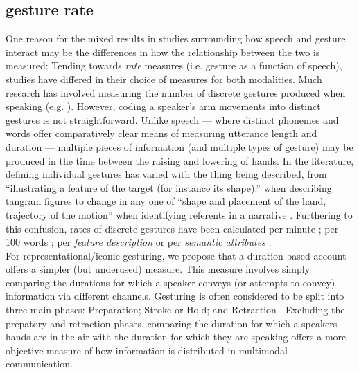 \documentclass[a4paper,man,natbib]{apa6}
\newcommand*{\term}[1]{\emph{#1}} %
\begin{document}
\subsection{gesture rate}
One reason for the mixed results in studies surrounding how speech and gesture interact may be the differences in how the relationship between the two is measured:
Tending towards \term{rate} measures (i.e. gesture as a function of speech), studies have differed in their choice of measures for both modalities.
Much research has involved measuring the number of discrete gestures produced when speaking (e.g. \citet{Hostetter2007, Gerwing2011, DeRuiter2012, Hoetjes2015}).
However, coding a speaker's arm movements into distinct gestures is not straightforward.
Unlike speech --- where distinct phonemes and words offer comparatively clear means of measuring utterance length and duration --- multiple pieces of information (and multiple types of gesture) may be produced in the time between the raising and lowering of hands.
In the literature, defining individual gestures has varied with the thing being described, from ``illustrating a feature of the target (for instance its shape).'' when describing tangram figures \citep{DeRuiter2012} to change in any one of ``shape and placement of the hand, trajectory of the motion'' when identifying referents in a narrative \citep{So2009}.
Furthering to this confusion, rates of discrete gestures have been calculated per minute \citep{Mol2011}; per 100 words \citep{Masson-Carro2015, Hostetter2007, Gerwing2011, Hoetjes2015}; per \term{feature description} \citep{DeRuiter2012} or per \term{semantic attributes} \citep{Hoetjes2015}.\\

For representational/iconic gesturing, we propose that a duration-based account offers a simpler (but underused) measure.
This measure involves simply comparing the durations for which a speaker conveys (or attempts to convey) information via different channels. 
Gesturing is often considered to be split into three main phases: Preparation; Stroke or Hold; and Retraction \citep{McNeill1992}.
Excluding the prepatory and retraction phases, comparing the duration for which a speakers hands are in the air with the duration for which they are speaking offers a more objective measure of how 
information is distributed in multimodal communication.
\end{document}

